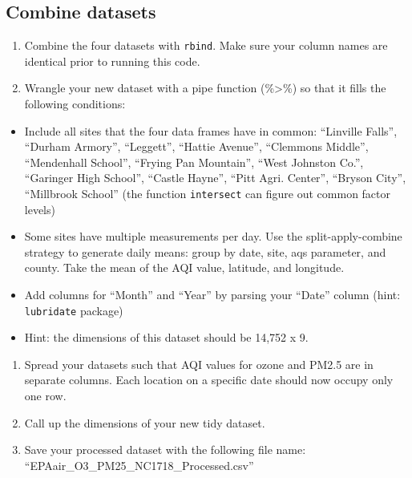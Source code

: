\documentclass[
]{article}
\providecommand{\tightlist}{%
  \setlength{\itemsep}{0pt}\setlength{\parskip}{0pt}}
\begin{document}
\hypertarget{combine-datasets}{%
\subsection{Combine datasets}\label{combine-datasets}}

\begin{enumerate}
\def\labelenumi{\arabic{enumi}.}
\setcounter{enumi}{6}
\tightlist
\item
  Combine the four datasets with \texttt{rbind}. Make sure your column
  names are identical prior to running this code.
\item
  Wrangle your new dataset with a pipe function (\%\textgreater\%) so
  that it fills the following conditions:
\end{enumerate}

\begin{itemize}
\tightlist
\item
  Include all sites that the four data frames have in common: ``Linville
  Falls'', ``Durham Armory'', ``Leggett'', ``Hattie Avenue'', ``Clemmons
  Middle'', ``Mendenhall School'', ``Frying Pan Mountain'', ``West
  Johnston Co.'', ``Garinger High School'', ``Castle Hayne'', ``Pitt
  Agri. Center'', ``Bryson City'', ``Millbrook School'' (the function
  \texttt{intersect} can figure out common factor levels)
\item
  Some sites have multiple measurements per day. Use the
  split-apply-combine strategy to generate daily means: group by date,
  site, aqs parameter, and county. Take the mean of the AQI value,
  latitude, and longitude.
\item
  Add columns for ``Month'' and ``Year'' by parsing your ``Date'' column
  (hint: \texttt{lubridate} package)
\item
  Hint: the dimensions of this dataset should be 14,752 x 9.
\end{itemize}

\begin{enumerate}
\def\labelenumi{\arabic{enumi}.}
\setcounter{enumi}{8}
\tightlist
\item
  Spread your datasets such that AQI values for ozone and PM2.5 are in
  separate columns. Each location on a specific date should now occupy
  only one row.
\item
  Call up the dimensions of your new tidy dataset.
\item
  Save your processed dataset with the following file name:
  ``EPAair\_O3\_PM25\_NC1718\_Processed.csv''
\end{enumerate}
\end{document}
